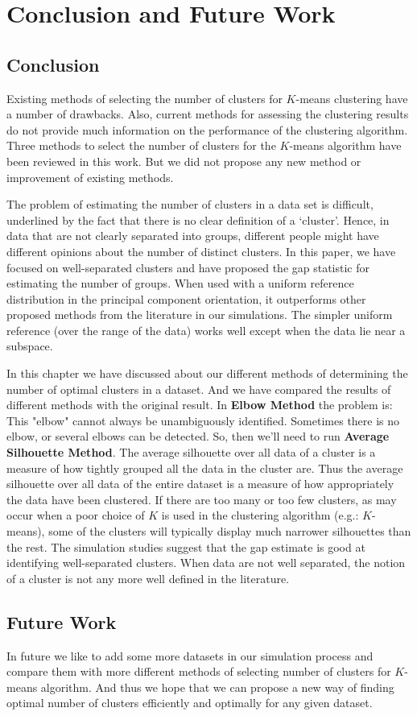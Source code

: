 \chapter{Conclusion and Future Work}\label{ch:conclusion}

\section{Conclusion}
Existing methods of selecting the number of clusters for $K$-means clustering have a number of drawbacks. Also,  current  methods  for  assessing  the  clustering results  do  not  provide   much  information   on  the
performance of the clustering algorithm. Three  methods  to  select  the  number  of  clusters for  the $K$-means  algorithm  have  been  reviewed  in this work. But we did not propose any new method or improvement of existing methods.

The problem of estimating the number of clusters in a data set is difficult, underlined by the fact that there is no clear definition of a `cluster'. Hence, in data that are not clearly separated into groups, different people might have different opinions about the number of distinct clusters. In this paper, we have focused on well-separated clusters and have proposed the gap statistic for estimating the number of groups. When used with a uniform reference distribution in the principal component orientation, it outperforms other proposed methods
from the literature in our simulations. The simpler uniform reference (over the range of the data) works well except when the data lie near a subspace.

In this chapter we have discussed about our different methods of determining the number of optimal clusters
in a dataset. And we have compared the results of different methods with the original result. In \textbf{Elbow Method} the problem  is:  This  "elbow"  cannot always  be  unambiguously  identified.  Sometimes  there  is  no  elbow,  or several elbows can be detected. So, then we'll need to run \textbf{Average Silhouette Method}. The average silhouette over all data of a cluster is a measure of how tightly grouped all the data in the cluster are. Thus the average silhouette over all data of the entire dataset is a measure of how appropriately the data have been clustered. If there are too many or too few clusters, as may occur when a poor choice of $K$ is used in the clustering algorithm (e.g.: $K$-means), some of the clusters will typically display much narrower silhouettes than the rest. The simulation studies suggest that the gap estimate is good at identifying well-separated clusters. When data are not well separated, the notion of a cluster is not any more well defined in the literature.

\section{Future Work}
In future we like to add some more datasets in our simulation process and compare them with more different methods of selecting number of clusters for $K$-means algorithm. And thus we hope that we can propose a new way of finding
optimal number of clusters efficiently and optimally for any given dataset.

\endinput
